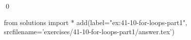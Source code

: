 
\begin{ex}
  \label{ex:41-10-for-loops-part1}
  
  \qed
\end{ex}
\begin{python0}
from solutions import *
add(label="ex:41-10-for-loops-part1",
    srcfilename='exercises/41-10-for-loops-part1/answer.tex')
\end{python0}
